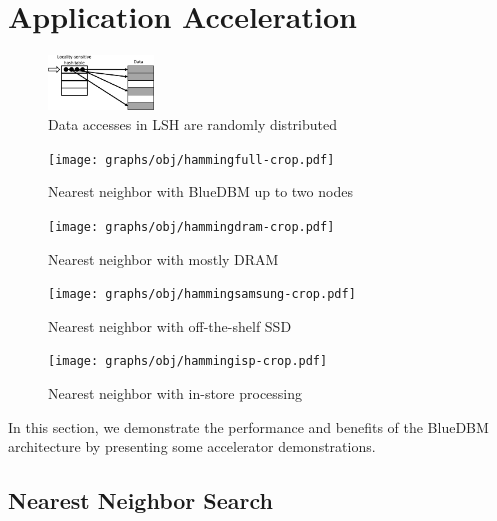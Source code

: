 
\section{Application Acceleration}
\label{sec:acceleration}
\begin{figure}[t!]
	\centering
	\includegraphics[width=0.25\textwidth]{figures/lsh-crop.pdf}
	\caption{Data accesses in LSH are randomly distributed}
	\label{fig:lsh}
\end{figure}


\begin{figure}[t]
\centering
\vspace{0pt}
\begin{minipage}[t]{.2\textwidth}
	\texttt{[image: graphs/obj/hammingfull-crop.pdf]}
	\caption{Nearest neighbor with BlueDBM up to two nodes}
	\label{fig:result_hammingfull}
\end{minipage}\hfill
\vspace{0pt}
\begin{minipage}[t]{.2\textwidth}
	\texttt{[image: graphs/obj/hammingdram-crop.pdf]}
	\caption{Nearest neighbor with mostly DRAM}
	\label{fig:result_hammingdram}
\end{minipage}\hfill
\vspace{0pt}
\begin{minipage}[t]{.2\textwidth}
	\texttt{[image: graphs/obj/hammingsamsung-crop.pdf]}
	\caption{Nearest neighbor with off-the-shelf SSD}
	\label{fig:result_hammingsamsung}
\end{minipage}\hfill
\vspace{0pt}
\begin{minipage}[t]{.2\textwidth}
	\texttt{[image: graphs/obj/hammingisp-crop.pdf]}
	\caption{Nearest neighbor with in-store processing}
	\label{fig:result_hammingisp}
\end{minipage}
\end{figure}

In this section, we demonstrate the performance and benefits of the BlueDBM
architecture by presenting some accelerator demonstrations. 

\subsection{Nearest Neighbor Search}


